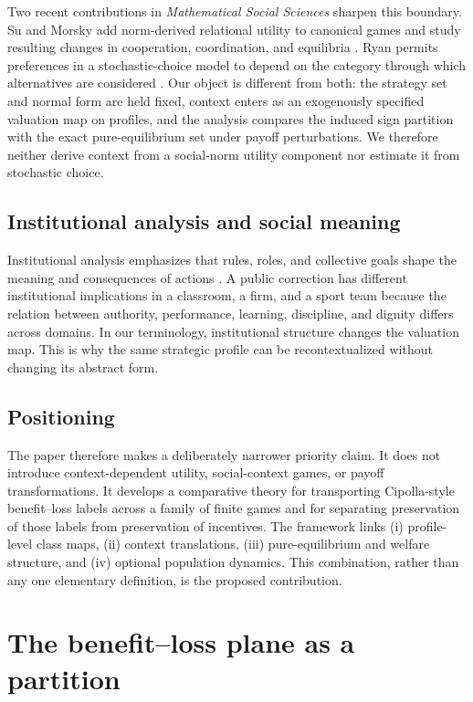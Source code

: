 \documentclass[a4paper,fleqn]{cas-dc}
\theoremstyle{remark}
\begin{document}
Two recent contributions in \emph{Mathematical Social Sciences} sharpen this boundary. Su and Morsky add norm-derived relational utility to canonical games and study resulting changes in cooperation, coordination, and equilibria \citep{SuMorsky2024}. Ryan permits preferences in a stochastic-choice model to depend on the category through which alternatives are considered \citep{Ryan2026}. Our object is different from both: the strategy set and normal form are held fixed, context enters as an exogenously specified valuation map on profiles, and the analysis compares the induced sign partition with the exact pure-equilibrium set under payoff perturbations. We therefore neither derive context from a social-norm utility component nor estimate it from stochastic choice.

\subsection{Institutional analysis and social meaning}

Institutional analysis emphasizes that rules, roles, and collective goals shape the meaning and consequences of actions \citep{Ostrom2005}. A public correction has different institutional implications in a classroom, a firm, and a sport team because the relation between authority, performance, learning, discipline, and dignity differs across domains. In our terminology, institutional structure changes the valuation map. This is why the same strategic profile can be recontextualized without changing its abstract form.

\subsection{Positioning}

The paper therefore makes a deliberately narrower priority claim. It does not
introduce context-dependent utility, social-context games, or payoff
transformations. It develops a comparative theory for transporting
Cipolla-style benefit--loss labels across a family of finite games and for
separating preservation of those labels from preservation of incentives. The
framework links (i) profile-level class maps, (ii) context translations, (iii)
pure-equilibrium and welfare structure, and (iv) optional population dynamics.
This combination, rather than any one elementary definition, is the proposed
contribution.

\section{The benefit--loss plane as a partition}
\label{sec:plane}
\end{document}
